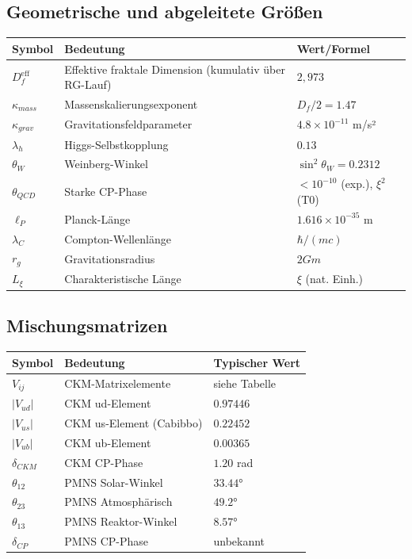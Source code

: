 \subsection{Geometrische und abgeleitete Größen}
\begin{longtable}{lll}
	\toprule
	\textbf{Symbol} & \textbf{Bedeutung} & \textbf{Wert/Formel} \\
	\midrule
	$D_f^{\text{eff}}$ & Effektive fraktale Dimension (kumulativ über RG-Lauf) & $2{,}973$ \\
	$\kappa_{mass}$ & Massenskalierungsexponent & $D_f/2 = 1.47$ \\
	$\kappa_{grav}$ & Gravitationsfeldparameter & $4.8 \times 10^{-11}$ m/s² \\
	$\lambda_h$ & Higgs-Selbstkopplung & $0.13$ \\
	$\theta_W$ & Weinberg-Winkel & $\sin^2\theta_W = 0.2312$ \\
	$\theta_{QCD}$ & Starke CP-Phase & $< 10^{-10}$ (exp.), $\xi^2$ (T0) \\
	$\ell_P$ & Planck-Länge & $1.616 \times 10^{-35}$ m \\
	$\lambda_C$ & Compton-Wellenlänge & $\hbar/(mc)$ \\
	$r_g$ & Gravitationsradius & $2Gm$ \\
	$L_\xi$ & Charakteristische Länge & $\xi$ (nat. Einh.) \\
	\bottomrule
\end{longtable}

\subsection{Mischungsmatrizen}
\begin{longtable}{lll}
	\toprule
	\textbf{Symbol} & \textbf{Bedeutung} & \textbf{Typischer Wert} \\
	\midrule
	$V_{ij}$ & CKM-Matrixelemente & siehe Tabelle \\
	$|V_{ud}|$ & CKM ud-Element & $0.97446$ \\
	$|V_{us}|$ & CKM us-Element (Cabibbo) & $0.22452$ \\
	$|V_{ub}|$ & CKM ub-Element & $0.00365$ \\
	$\delta_{CKM}$ & CKM CP-Phase & $1.20$ rad \\
	$\theta_{12}$ & PMNS Solar-Winkel & $33.44°$ \\
	$\theta_{23}$ & PMNS Atmosphärisch & $49.2°$ \\
	$\theta_{13}$ & PMNS Reaktor-Winkel & $8.57°$ \\
	$\delta_{CP}$ & PMNS CP-Phase & unbekannt \\
	\bottomrule
\end{longtable}

